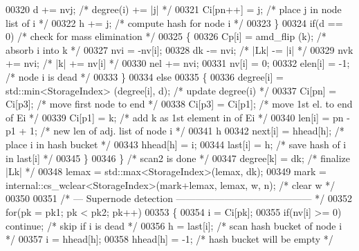 \begin{DoxyCode}
00320         d += nvj;                  \textcolor{comment}{/* degree(i) += |j| */}
00321         Ci[pn++] = j;             \textcolor{comment}{/* place j in node list of i */}
00322         h += j;                    \textcolor{comment}{/* compute hash for node i */}
00323       \}
00324       \textcolor{keywordflow}{if}(d == 0)                     \textcolor{comment}{/* check for mass elimination */}
00325       \{
00326         Cp[i] = amd\_flip (k);      \textcolor{comment}{/* absorb i into k */}
00327         nvi = -nv[i];
00328         dk -= nvi;                 \textcolor{comment}{/* |Lk| -= |i| */}
00329         nvk += nvi;                \textcolor{comment}{/* |k| += nv[i] */}
00330         nel += nvi;
00331         nv[i] = 0;
00332         elen[i] = -1;             \textcolor{comment}{/* node i is dead */}
00333       \}
00334       \textcolor{keywordflow}{else}
00335       \{
00336         degree[i] = std::min<StorageIndex> (degree[i], d);   \textcolor{comment}{/* update degree(i) */}
00337         Ci[pn] = Ci[p3];         \textcolor{comment}{/* move first node to end */}
00338         Ci[p3] = Ci[p1];         \textcolor{comment}{/* move 1st el. to end of Ei */}
00339         Ci[p1] = k;               \textcolor{comment}{/* add k as 1st element in of Ei */}
00340         len[i] = pn - p1 + 1;     \textcolor{comment}{/* new len of adj. list of node i */}
00341         h %
00342         next[i] = hhead[h];      \textcolor{comment}{/* place i in hash bucket */}
00343         hhead[h] = i;
00344         last[i] = h;      \textcolor{comment}{/* save hash of i in last[i] */}
00345       \}
00346     \}                                   \textcolor{comment}{/* scan2 is done */}
00347     degree[k] = dk;                   \textcolor{comment}{/* finalize |Lk| */}
00348     lemax = std::max<StorageIndex>(lemax, dk);
00349     mark = internal::cs\_wclear<StorageIndex>(mark+lemax, lemax, w, n);    \textcolor{comment}{/* clear w */}
00350     
00351     \textcolor{comment}{/* --- Supernode detection ------------------------------------------ */}
00352     \textcolor{keywordflow}{for}(pk = pk1; pk < pk2; pk++)
00353     \{
00354       i = Ci[pk];
00355       \textcolor{keywordflow}{if}(nv[i] >= 0) \textcolor{keywordflow}{continue};         \textcolor{comment}{/* skip if i is dead */}
00356       h = last[i];                      \textcolor{comment}{/* scan hash bucket of node i */}
00357       i = hhead[h];
00358       hhead[h] = -1;                    \textcolor{comment}{/* hash bucket will be empty */}

\end{DoxyCode}
